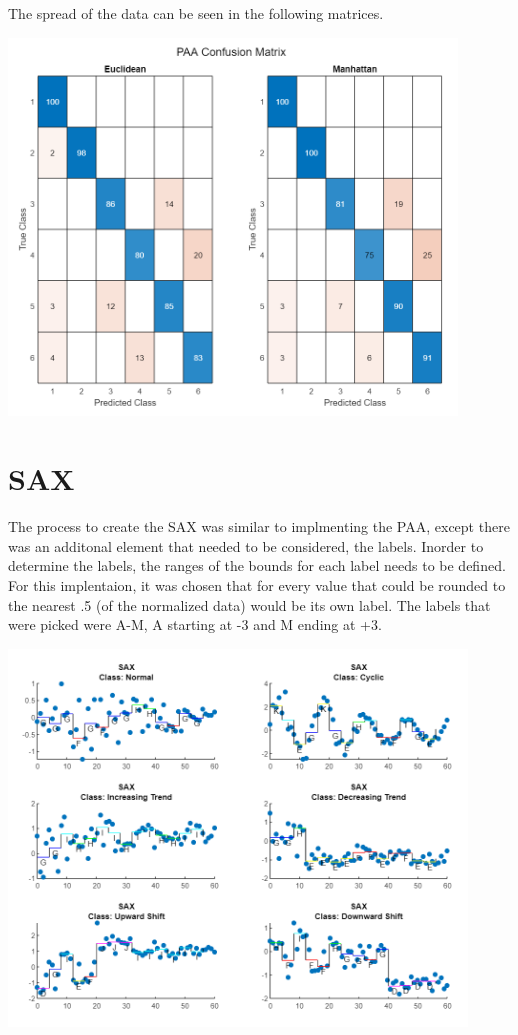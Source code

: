 \documentclass{article}
\begin{document}
The spread of the data can be seen in the following matrices.
\begin{center}
    {\includegraphics[height=10cm]{graphics/confusedpaa.png}\centering}
\end{center}


\section{SAX}
The process to create the SAX was similar to implmenting the PAA, except there
was an additonal element that needed to be considered, the labels.  Inorder to
determine the labels, the ranges of the bounds for each label needs to be defined.
For this implentaion, it was chosen that for every value that could be rounded 
to the nearest .5 (of the normalized data) would be its own label.  The labels
that were picked were A-M, A starting at -3 and M ending at +3. 

\begin{center}
    {\includegraphics[height=10cm]{graphics/saxplot.png}\centering}
\end{center}
\end{document}
